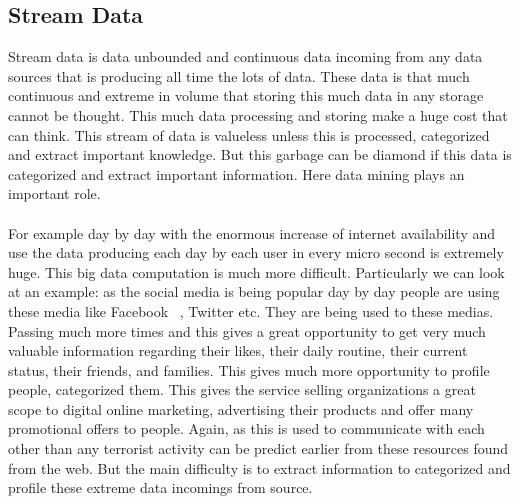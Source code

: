 \subsection{Stream Data}
Stream data is data unbounded and continuous data incoming from any data sources that is producing all time the lots of data. These data is that much continuous and extreme in volume that storing this much data in any storage cannot be thought. This much data processing and storing make a huge cost that can think. This stream of data is valueless unless this is processed, categorized and extract important knowledge. But this garbage can be diamond if this data is categorized and extract important information. Here data mining plays an important role.\\ \\
 For example day by day with the enormous increase of internet availability and use the data producing each day by each user in every micro second is extremely huge. This big data computation is much more difficult. Particularly we can look at an example: as the social media is being popular day by day people are using these media like Facebook ~\cite{facebook}, Twitter \cite{twitter} etc. They are being used to these medias. Passing much more times and this gives a great opportunity to get very much valuable information regarding their likes, their daily routine, their current status, their friends, and families. This gives much more opportunity to profile people, categorized them. This gives the service selling organizations a great scope to digital online marketing, advertising their products and offer many promotional offers to people. Again, as this is used to communicate with each other than any terrorist activity can be predict earlier from these resources found from the web. But the main difficulty is to extract information to categorized and profile these extreme data incomings from source.

